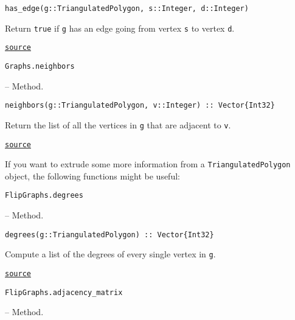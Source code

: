 \begin{adjustwidth}{2em}{0pt}


\begin{verbatim}
has_edge(g::TriangulatedPolygon, s::Integer, d::Integer)
\end{verbatim}

Return \texttt{true} if \texttt{g} has an edge going from vertex \texttt{s} to vertex \texttt{d}. 



\href{https://github.com/schto223/FlipGraphs.jl/blob/e35d43698a06b86273148826b79d585ba04fcd26/src/polygonTriangulations.jl#L81-L85}{\texttt{source}}


\end{adjustwidth}
\hypertarget{14095625494301593323}{\texttt{Graphs.neighbors}}  -- {Method.}

\begin{adjustwidth}{2em}{0pt}


\begin{verbatim}
neighbors(g::TriangulatedPolygon, v::Integer) :: Vector{Int32}
\end{verbatim}

Return the list of all the vertices in \texttt{g} that are adjacent to \texttt{v}.



\href{https://github.com/schto223/FlipGraphs.jl/blob/e35d43698a06b86273148826b79d585ba04fcd26/src/polygonTriangulations.jl#L95-L99}{\texttt{source}}


\end{adjustwidth}

If you want to extrude some more information from a \texttt{TriangulatedPolygon} object, the following functions might be useful: 


\hypertarget{9379494963205808776}{\texttt{FlipGraphs.degrees}}  -- {Method.}

\begin{adjustwidth}{2em}{0pt}


\begin{verbatim}
degrees(g::TriangulatedPolygon) :: Vector{Int32}
\end{verbatim}

Compute a list of the degrees of every single vertex in \texttt{g}.



\href{https://github.com/schto223/FlipGraphs.jl/blob/e35d43698a06b86273148826b79d585ba04fcd26/src/polygonTriangulations.jl#L222-L226}{\texttt{source}}


\end{adjustwidth}
\hypertarget{2070049552425424645}{\texttt{FlipGraphs.adjacency\_matrix}}  -- {Method.}

